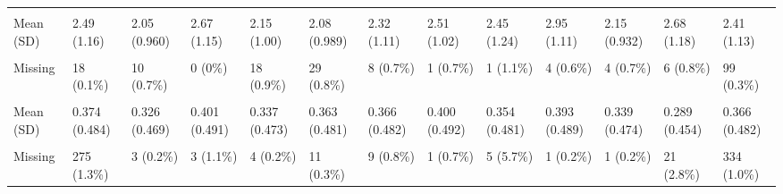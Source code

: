 \documentclass[
  single column]{article}
\begin{document}
\begin{landscape}
\begin{longtable}[t]{lllllllllllll}
\cellcolor{gray!10}{Left-Wing Authoritarianism} & \cellcolor{gray!10}{} & \cellcolor{gray!10}{} & \cellcolor{gray!10}{} & \cellcolor{gray!10}{} & \cellcolor{gray!10}{} & \cellcolor{gray!10}{} & \cellcolor{gray!10}{} & \cellcolor{gray!10}{} & \cellcolor{gray!10}{} & \cellcolor{gray!10}{} & \cellcolor{gray!10}{} & \cellcolor{gray!10}{}\\
Mean (SD) & 2.49 (1.16) & 2.05 (0.960) & 2.67 (1.15) & 2.15 (1.00) & 2.08 (0.989) & 2.32 (1.11) & 2.51 (1.02) & 2.45 (1.24) & 2.95 (1.11) & 2.15 (0.932) & 2.68 (1.18) & 2.41 (1.13)\\
\cellcolor{gray!10}{Median [Min, Max]} & \cellcolor{gray!10}{2.33 [1.00, 7.00]} & \cellcolor{gray!10}{1.80 [1.00, 7.00]} & \cellcolor{gray!10}{2.50 [1.00, 7.00]} & \cellcolor{gray!10}{2.00 [1.00, 7.00]} & \cellcolor{gray!10}{1.80 [1.00, 7.00]} & \cellcolor{gray!10}{2.00 [1.00, 7.00]} & \cellcolor{gray!10}{2.40 [1.00, 5.67]} & \cellcolor{gray!10}{2.30 [1.00, 6.20]} & \cellcolor{gray!10}{2.80 [1.00, 7.00]} & \cellcolor{gray!10}{2.00 [1.00, 6.60]} & \cellcolor{gray!10}{2.60 [1.00, 7.00]} & \cellcolor{gray!10}{2.20 [1.00, 7.00]}\\
Missing & 18 (0.1\%) & 10 (0.7\%) & 0 (0\%) & 18 (0.9\%) & 29 (0.8\%) & 8 (0.7\%) & 1 (0.7\%) & 1 (1.1\%) & 4 (0.6\%) & 4 (0.7\%) & 6 (0.8\%) & 99 (0.3\%)\\
\addlinespace
\cellcolor{gray!10}{Male (Yes/No)} & \cellcolor{gray!10}{} & \cellcolor{gray!10}{} & \cellcolor{gray!10}{} & \cellcolor{gray!10}{} & \cellcolor{gray!10}{} & \cellcolor{gray!10}{} & \cellcolor{gray!10}{} & \cellcolor{gray!10}{} & \cellcolor{gray!10}{} & \cellcolor{gray!10}{} & \cellcolor{gray!10}{} & \cellcolor{gray!10}{}\\
Mean (SD) & 0.374 (0.484) & 0.326 (0.469) & 0.401 (0.491) & 0.337 (0.473) & 0.363 (0.481) & 0.366 (0.482) & 0.400 (0.492) & 0.354 (0.481) & 0.393 (0.489) & 0.339 (0.474) & 0.289 (0.454) & 0.366 (0.482)\\
\cellcolor{gray!10}{Median [Min, Max]} & \cellcolor{gray!10}{0 [0, 1.00]} & \cellcolor{gray!10}{0 [0, 1.00]} & \cellcolor{gray!10}{0 [0, 1.00]} & \cellcolor{gray!10}{0 [0, 1.00]} & \cellcolor{gray!10}{0 [0, 1.00]} & \cellcolor{gray!10}{0 [0, 1.00]} & \cellcolor{gray!10}{0 [0, 1.00]} & \cellcolor{gray!10}{0 [0, 1.00]} & \cellcolor{gray!10}{0 [0, 1.00]} & \cellcolor{gray!10}{0 [0, 1.00]} & \cellcolor{gray!10}{0 [0, 1.00]} & \cellcolor{gray!10}{0 [0, \vphantom{1} 1.00]}\\
Missing & 275 (1.3\%) & 3 (0.2\%) & 3 (1.1\%) & 4 (0.2\%) & 11 (0.3\%) & 9 (0.8\%) & 1 (0.7\%) & 5 (5.7\%) & 1 (0.2\%) & 1 (0.2\%) & 21 (2.8\%) & 334 (1.0\%)\\

\end{longtable}
\end{landscape}
\end{document}
